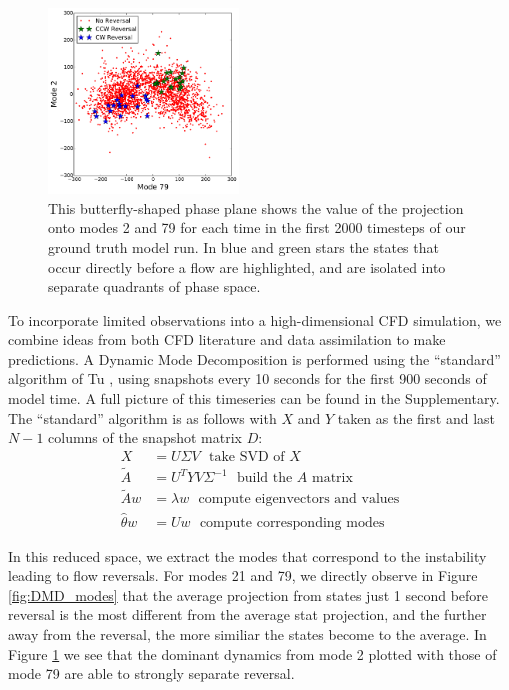 \begin{figure}[t]
  \centering
  \includegraphics[width=0.45\textwidth]{../figures/DMD/DMD_mode_2_79_phaseplane-003.pdf}
  \caption[]{
    This butterfly-shaped phase plane shows the value of the projection onto modes 2 and 79 for each time in the first 2000 timesteps of our ground truth model run.
    In blue and green stars the states that occur directly before a flow are highlighted, and are isolated into separate quadrants of phase space.
  }
  \label{fig:DMD_phaseplane}
\end{figure}

To incorporate limited observations into a high-dimensional CFD simulation, we combine ideas from both CFD literature and data assimilation to make predictions.
A Dynamic Mode Decomposition is performed using the ``standard'' algorithm of Tu \cite{tu2013dynamic}, using snapshots every 10 seconds for the first 900 seconds of model time.
A full picture of this timeseries can be found in the Supplementary.
The ``standard'' algorithm is as follows with $X$ and $Y$ taken as the first and last $N-1$ columns of the snapshot matrix $D$:
\begin{align*} X &= U\Sigma V~~~ \text{take SVD of $X$}\\
  \tilde{A} &= U^T Y V \Sigma ^{-1}~~~ \text{build the $A$ matrix}\\
  \tilde{A}w &= \lambda w~~~ \text{compute eigenvectors and values}\\
  \hat{\theta}w &= U w~~~ \text{compute corresponding modes}\end{align*}

In this reduced space, we extract the modes that correspond to the instability leading to flow reversals.
For modes 21 and 79, we directly observe in Figure \ref{fig:DMD_modes} that the average projection from states just 1 second before reversal is the most different from the average stat projection, and the further away from the reversal, the more similiar the states become to the average.
In Figure \ref{fig:DMD_phaseplane} we see that the dominant dynamics from mode 2 plotted with those of mode 79 are able to strongly separate reversal.

